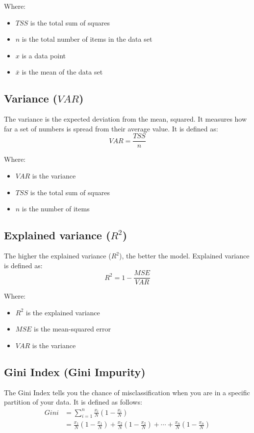 \documentclass[11pt]{article}
\begin{document}
Where:
\begin{itemize}
\item \(TSS\) is the total sum of squares
\item \(n\) is the total number of items in the data set
\item \(x\) is a data point
\item \(\bar{x}\) is the mean of the data set
\end{itemize}
\subsection{Variance (\(VAR\))}
\label{sec:orgaa514ca}
The variance is the expected deviation from the mean, squared. It measures how far a set of numbers is spread from their average value. It is defined as:
\[VAR = \frac{TSS}{n}\]

Where:
\begin{itemize}
\item \(VAR\) is the variance
\item \(TSS\) is the total sum of squares
\item \(n\) is the number of items
\end{itemize}
\subsection{Explained variance (\(R^2\))}
\label{sec:orgd9558f1}
The higher the explained variance (\(R^2\)), the better the model. Explained variance is defined as:
\[R^2 = 1 - \frac{MSE}{VAR}\]

Where:
\begin{itemize}
\item \(R^2\) is the explained variance
\item \(MSE\) is the mean-squared error
\item \(VAR\) is the variance
\end{itemize}
\subsection{Gini Index (Gini Impurity)}
\label{sec:orgf4157d6}
The Gini Index tells you the chance of misclassification when you are in a specific partition of your data. It is defined as follows:
\begin{align*}
Gini &= \sum_{i = 1}^n \frac{x_i}{N} \left(1 - \frac{x_i}{N} \right) \\
&= \frac{x_1}{N} \left(1 - \frac{x_1}{N} \right) + \frac{x_2}{N} \left(1 - \frac{x_2}{N} \right) + \cdots + \frac{x_n}{N} \left(1 - \frac{x_n}{N} \right)
\end{align*}
\end{document}
